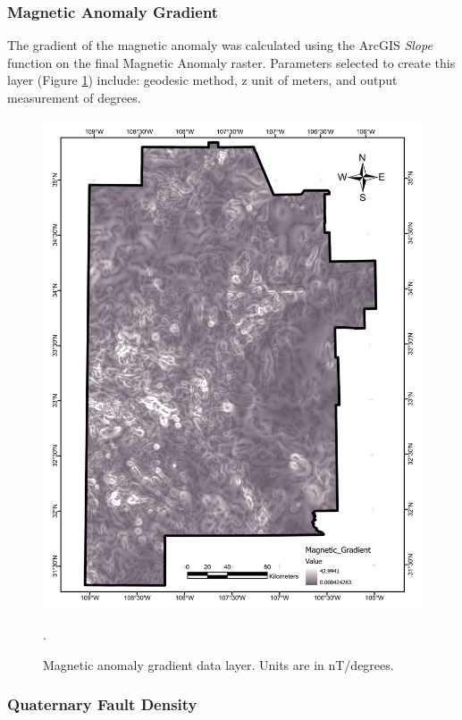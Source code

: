 \subsubsection{Magnetic Anomaly Gradient}

The gradient of the magnetic anomaly was calculated using the ArcGIS \textit{Slope} function on the final Magnetic Anomaly raster. Parameters selected to create this layer (Figure \ref{fig:feat_magnetic_gradient}) include: geodesic method, z unit of meters, and output measurement of degrees.

\begin{figure}[!htp]
\centering
\includegraphics[scale=.50]{templates/images/Figure-MagneticGradient.pdf}
\caption[Magnetic anomaly gradient data layer]{Magnetic anomaly gradient data layer. Units are in nT/degrees.}.
\label{fig:feat_magnetic_gradient}
\end{figure}

\subsubsection{Quaternary Fault Density}

